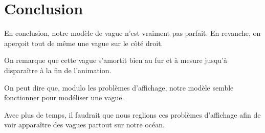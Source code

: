 \documentclass{article}
\begin{document}
\vspace{1cm}

\section{Conclusion}

En conclusion, notre modèle de vague n'est vraiment pas parfait. En revanche, on aperçoit tout de même une vague sur le côté droit.

On remarque que cette vague s'amortit bien au fur et à mesure jusqu'à disparaître à la fin de l'animation.

On peut dire que, modulo les problèmes d'affichage, notre modèle semble fonctionner pour modéliser une vague.

Avec plus de temps, il faudrait que nous reglions ces problèmes d'affichage afin de voir apparaître des vagues partout sur notre océan.
\end{document}
